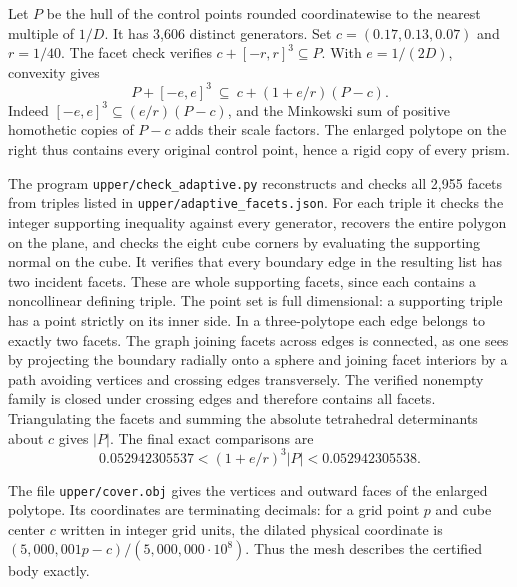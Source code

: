Let $P$ be the hull of the control points rounded coordinatewise to the
nearest multiple of $1/D$. It has 3,606 distinct generators. Set
$c=(0.17,0.13,0.07)$ and $r=1/40$. The facet check verifies
$c+[-r,r]^3\subseteq P$. With $e=1/(2D)$, convexity gives
\[
 P+[-e,e]^3\ \subseteq\ c+(1+e/r)(P-c).
\]
Indeed $[-e,e]^3\subseteq(e/r)(P-c)$, and the Minkowski sum of
positive homothetic copies of $P-c$ adds their scale factors. The
enlarged polytope on the right thus contains every original control
point, hence a rigid copy of every prism.

The program \texttt{upper/check\_adaptive.py} reconstructs and checks
all 2,955 facets from triples listed in
\texttt{upper/adaptive\_facets.json}. For each triple it checks the
integer supporting inequality against every generator, recovers the
entire polygon on the plane, and checks the eight cube corners by
evaluating the supporting normal on the cube. It verifies that every
boundary edge in the resulting list has two incident facets.
These are whole supporting facets, since each contains a noncollinear defining triple. The point set is full dimensional: a supporting triple has a point strictly on its inner side. In a three-polytope each edge belongs to exactly two facets. The graph joining facets across edges is connected, as one sees by projecting the boundary radially onto a sphere and joining facet interiors by a path avoiding vertices and crossing edges transversely. The verified nonempty family is closed under crossing edges and therefore contains all facets. Triangulating the facets
and summing the absolute tetrahedral determinants about $c$ gives
$|P|$. The final exact comparisons are
\[
 0.052942305537<(1+e/r)^3|P|<0.052942305538 .
\]

The file \texttt{upper/cover.obj} gives the vertices and outward faces of the
enlarged polytope. Its coordinates are terminating decimals: for a grid point
$p$ and cube center $c$ written in integer grid units, the dilated physical
coordinate is $(5{,}000{,}001p-c)/(5{,}000{,}000\cdot10^8)$.
Thus the mesh describes the certified body exactly.

